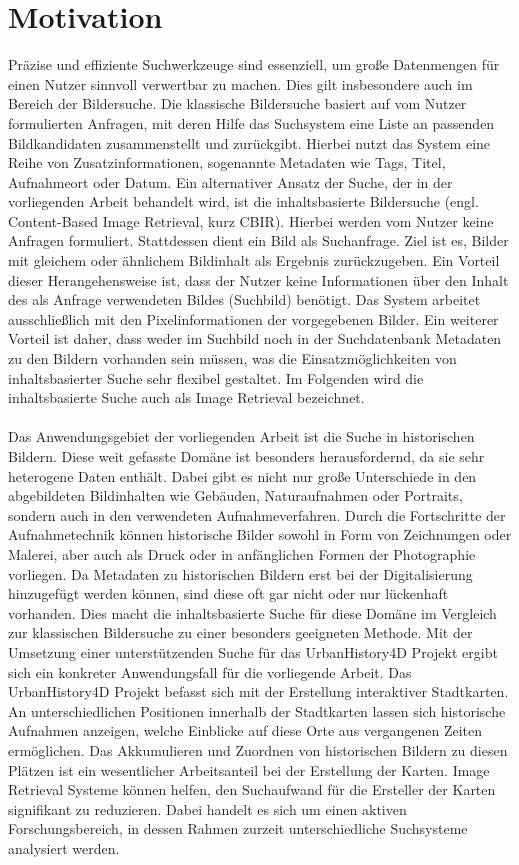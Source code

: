 \chapter{Motivation}
Präzise und effiziente Suchwerkzeuge sind essenziell, um große Datenmengen für einen Nutzer sinnvoll verwertbar zu machen. Dies gilt insbesondere auch im Bereich der Bildersuche. Die klassische Bildersuche basiert auf vom Nutzer formulierten Anfragen, mit deren Hilfe das Suchsystem eine Liste an passenden Bildkandidaten zusammenstellt und zurückgibt. Hierbei nutzt das System eine Reihe von Zusatzinformationen, sogenannte Metadaten wie Tags, Titel, Aufnahmeort oder Datum. Ein alternativer Ansatz der Suche, der in der vorliegenden Arbeit behandelt wird, ist die inhaltsbasierte Bildersuche (engl. Content-Based Image Retrieval, kurz CBIR). Hierbei werden vom Nutzer keine Anfragen formuliert. Stattdessen dient ein Bild als Suchanfrage. Ziel ist es, Bilder mit gleichem oder ähnlichem Bildinhalt als Ergebnis zurückzugeben. Ein Vorteil dieser Herangehensweise ist, dass der Nutzer keine Informationen über den Inhalt des als Anfrage verwendeten Bildes (Suchbild) benötigt. Das System arbeitet ausschließlich mit den Pixelinformationen der vorgegebenen Bilder. Ein weiterer Vorteil ist daher, dass weder im Suchbild noch in der Suchdatenbank Metadaten zu den Bildern vorhanden sein müssen, was die Einsatzmöglichkeiten von inhaltsbasierter Suche sehr flexibel gestaltet. Im Folgenden wird die inhaltsbasierte Suche auch als Image Retrieval bezeichnet.
\\\\
Das Anwendungsgebiet der vorliegenden Arbeit ist die Suche in historischen Bildern. Diese weit gefasste Domäne ist besonders herausfordernd, da sie sehr heterogene Daten enthält. Dabei gibt es nicht nur große Unterschiede in den abgebildeten Bildinhalten wie Gebäuden, Naturaufnahmen oder Portraits, sondern auch in den verwendeten Aufnahmeverfahren. Durch die Fortschritte der Aufnahmetechnik können historische Bilder sowohl in Form von Zeichnungen oder Malerei, aber auch als Druck oder in anfänglichen Formen der Photographie vorliegen. Da Metadaten zu historischen Bildern erst bei der Digitalisierung hinzugefügt werden können, sind diese oft gar nicht oder nur lückenhaft vorhanden. Dies macht die inhaltsbasierte Suche für diese Domäne im Vergleich zur klassischen Bildersuche zu einer besonders geeigneten Methode. Mit der Umsetzung einer unterstützenden Suche für das UrbanHistory4D Projekt \cite{urbanhistory4d} ergibt sich ein konkreter Anwendungsfall für die vorliegende Arbeit. Das UrbanHistory4D Projekt befasst sich mit der Erstellung interaktiver Stadtkarten. An unterschiedlichen Positionen innerhalb der Stadtkarten lassen sich historische Aufnahmen anzeigen, welche Einblicke auf diese Orte aus vergangenen Zeiten ermöglichen. Das Akkumulieren und Zuordnen von historischen Bildern zu diesen Plätzen ist ein wesentlicher Arbeitsanteil bei der Erstellung der Karten. Image Retrieval Systeme können helfen, den Suchaufwand für die Ersteller der Karten signifikant zu reduzieren. Dabei handelt es sich um einen aktiven Forschungsbereich, in dessen Rahmen zurzeit unterschiedliche Suchsysteme analysiert werden. 
